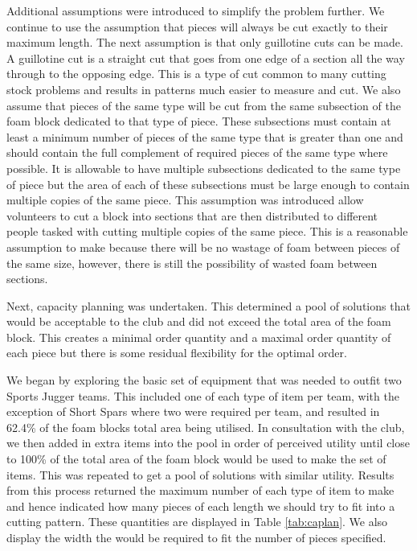 \documentclass[10pt,a4paper]{article}
\begin{document}
Additional assumptions were introduced to simplify the problem further. We continue to use the assumption that pieces will always be cut exactly to their maximum length. The next assumption is that only guillotine cuts can be made. A guillotine cut is a straight cut that goes from one edge of a section all the way through to the opposing edge. This is a type of cut common to many cutting stock problems and results in patterns much easier to measure and cut. We also assume that pieces of the same type will be cut from the same subsection of the foam block dedicated to that type of piece. These subsections must contain at least a minimum number of pieces of the same type that is greater than one and should contain the full complement of required pieces of the same type where possible. It is allowable to have multiple subsections dedicated to the same type of piece but the area of each of these subsections must be large enough to contain multiple copies of the same piece. This assumption was introduced allow volunteers to cut a block into sections that are then distributed to different people tasked with cutting multiple copies of the same piece. This is a reasonable assumption to make because there will be no wastage of foam between pieces of the same size, however, there is still the possibility of wasted foam between sections.

Next, capacity planning was undertaken. This determined a pool of solutions that would be acceptable to the club and did not exceed the total area of the foam block. This creates a minimal order quantity and a maximal order quantity of each piece but there is some residual flexibility for the optimal order.

We began by exploring the basic set of equipment that was needed to outfit two Sports Jugger teams. This included one of each type of item per team, with the exception of Short Spars where two were required per team, and resulted in 62.4\% of the foam blocks total area being utilised. In consultation with the club, we then added in extra items into the pool in order of perceived utility until close to 100\% of the total area of the foam block would be used to make the set of items. This was repeated to get a pool of solutions with similar utility. Results from this process returned the maximum number of each type of item to make and hence indicated how many pieces of each length we should try to fit into a cutting pattern. These quantities are displayed in Table \ref{tab:caplan}. We also display the width the would be required to fit the number of pieces specified.  
\end{document}
